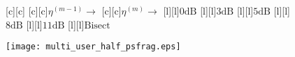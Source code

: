\documentclass{article}
\begin{document}
\begin{figure}[htb]
  \begin{center}

        [c][c]{}
        [c][c]{$\eta^{(m-1)} \rightarrow$}
        [c][c]{$\eta^{(m)} \rightarrow$}
        [l][l]{$\mathrm{0dB}$}
        [l][l]{$\mathrm{3dB}$}
	[l]{$\mathrm{5dB}$}
	[l]{$\mathrm{8dB}$}
        [l][l]{$\mathrm{11dB}$}       
	[l]{$\mathrm{Bisect}$}

    \texttt{[image: multi\_user\_half\_psfrag.eps]}
    \end{center}
\end{figure}
\end{document}
